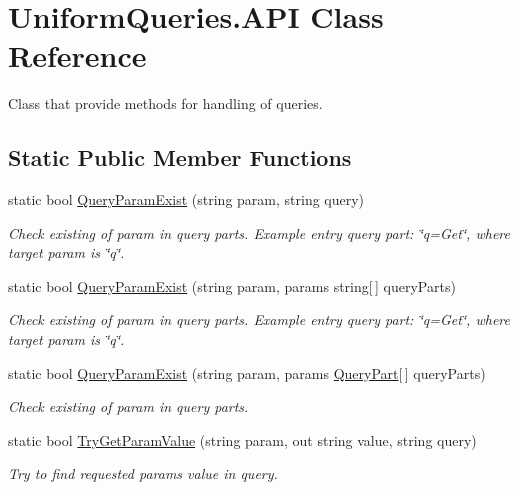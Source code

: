 \hypertarget{class_uniform_queries_1_1_a_p_i}{}\section{Uniform\+Queries.\+A\+PI Class Reference}
\label{class_uniform_queries_1_1_a_p_i}


Class that provide methods for handling of queries.  


\subsection*{Static Public Member Functions}
\begin{DoxyCompactItemize}
\item 
static bool \mbox{\hyperlink{class_uniform_queries_1_1_a_p_i_a1a0ad73e1dad7f7ec61398cb33ec18a4}{Query\+Param\+Exist}} (string param, string query)
\begin{DoxyCompactList}\small\item\em Check existing of param in query parts. Example entry query part\+: \char`\"{}q=\+Get\char`\"{}, where target param is \char`\"{}q\char`\"{}. \end{DoxyCompactList}\item 
static bool \mbox{\hyperlink{class_uniform_queries_1_1_a_p_i_a0f6c53ca64000015c8bf7bed30d9c57a}{Query\+Param\+Exist}} (string param, params string\mbox{[}$\,$\mbox{]} query\+Parts)
\begin{DoxyCompactList}\small\item\em Check existing of param in query parts. Example entry query part\+: \char`\"{}q=\+Get\char`\"{}, where target param is \char`\"{}q\char`\"{}. \end{DoxyCompactList}\item 
static bool \mbox{\hyperlink{class_uniform_queries_1_1_a_p_i_ac0f8c9faebdc4a69f2072c0bb9e955e1}{Query\+Param\+Exist}} (string param, params \mbox{\hyperlink{struct_uniform_queries_1_1_query_part}{Query\+Part}}\mbox{[}$\,$\mbox{]} query\+Parts)
\begin{DoxyCompactList}\small\item\em Check existing of param in query parts. \end{DoxyCompactList}\item 
static bool \mbox{\hyperlink{class_uniform_queries_1_1_a_p_i_a987eb23a48b90e542001cc12fcbc1ddc}{Try\+Get\+Param\+Value}} (string param, out string value, string query)
\begin{DoxyCompactList}\small\item\em Try to find requested param\textquotesingle{}s value in query. \end{DoxyCompactList}\item 

\end{DoxyCompactItemize}
